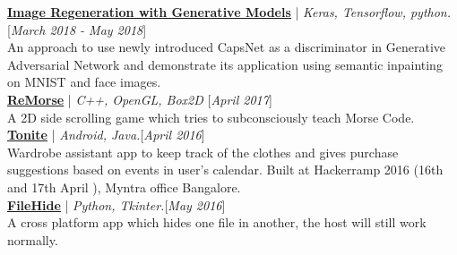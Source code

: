 \documentclass[10pt]{article}
\renewcommand{\textbf}[1]{{\bfseries\color{accent_darkest}#1}}
\begin{document}
\textbf{\underline{\href{https://github.com/RaghavaDhanya/Rudolf}
{Image Regeneration with Generative Models}}} | \textit{Keras, Tensorflow, python.}\hfill\textcolor{grey_darker}{[\textit{March 2018 - May 2018}]}\\
An approach to use newly introduced CapsNet as a discriminator in Generative Adversarial Network and demonstrate its application using semantic inpainting on MNIST and face images.
\smallskip
\\
\textbf{\underline{\href{https://github.com/RaghavaDhanya/ReMorse}
{ReMorse}}}  | \textit{C++, OpenGL, Box2D} \hfill\textcolor{grey_darker}{[\textit{April 2017}]}
\\
A 2D side scrolling game which tries to subconsciously teach Morse Code.
\smallskip
\\
\textbf{\underline{\href{https://github.com/abhijith0505/Tonite}
{Tonite}}} | \textit{Android, Java.}\hfill\textcolor{grey_darker}{[\textit{April 2016}]}\\
Wardrobe assistant app to keep track of the clothes and gives purchase
suggestions based on events in user's calendar. Built at Hackerramp
2016 (16th and 17th April ), Myntra office Bangalore.
\smallskip
\\
\textbf{\underline{\href{https://github.com/RaghavaDhanya/FileHide}
{FileHide}}} | \textit{Python, Tkinter.}\hfill\textcolor{grey_darker}{[\textit{May 2016}]}
\\
A cross platform app which hides one file in another, the host will
still work normally.
\smallskip

\end{document}
